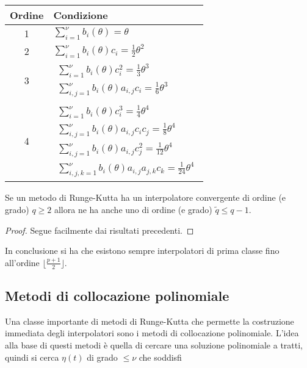 \begin{center}

\begin{tabular}{|c|l|}
  \hline
  Ordine 		&		 Condizione							\\
  \hline
  1			&		$\displaystyle \sum_{i=1}^{\nu} b_i(\theta) = \theta$		\\
  \hline
  2			&		$\displaystyle \sum_{i=1}^{\nu} b_i(\theta) c_i =
								\frac{1}{2} \theta^2 $			\\
  \hline
  3			&		$
					\begin{array}{lc}
					\displaystyle \sum_{i=1}^{\nu} b_i(\theta)c_i^2 =
					\frac{1}{3} \theta^3					\\
					\displaystyle \sum_{i,j=1}^{\nu} b_i(\theta)a_{i,j} c_i =
					\frac{1}{6} \theta^3
					\end{array}
					$								\\
\hline
  4			&		$
					\begin{array}{lc}
					\displaystyle \sum_{i=1}^{\nu} b_i(\theta)c_i^3 =
					\frac{1}{4} \theta^4					\\
					\displaystyle \sum_{i,j=1}^{\nu} b_i(\theta)a_{i,j} c_i c_j =
					\frac{1}{8} \theta^4					\\
					\displaystyle \sum_{i,j=1}^{\nu} b_i(\theta)a_{i,j} c_j^2 =
					\frac{1}{12} \theta^4					\\
					\displaystyle \sum_{i,j,k=1}^{\nu} b_i(\theta)a_{i,j} a_{j,k} c_k =
					\frac{1}{24} \theta^4					
					\end{array}
					$								\\
\hline
\end{tabular} 
\end{center}

\vspace{0.5cm}
\begin{thm}
 Se un metodo di Runge-Kutta ha un interpolatore convergente di ordine (e grado) $q \geq 2$ allora 
 ne ha anche uno  di ordine (e grado) $\tilde{q} \le q-1$.
\end{thm}

\begin{proof}
 Segue facilmente dai risultati precedenti.
\end{proof}


In conclusione si ha che esistono sempre interpolatori di prima classe fino 
all'ordine $ \lfloor \frac{p+1}{2} \rfloor$.

\subsection{Metodi di collocazione polinomiale}
Una classe importante di metodi di Runge-Kutta che permette la costruzione immediata degli interpolatori sono i metodi di collocazione polinomiale.
L'idea alla base di questi metodi è quella di cercare una soluzione polinomiale a tratti, quindi si cerca $\eta(t)$ di grado $\le \nu$ 
che soddisfi

